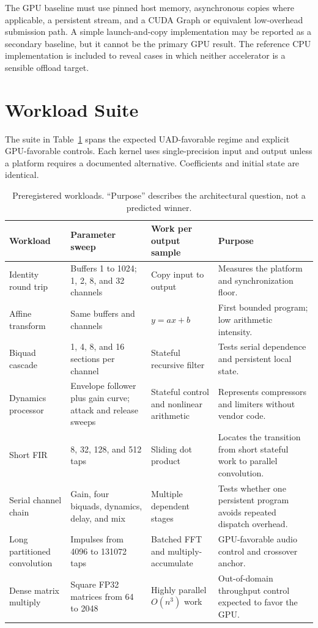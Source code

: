 \documentclass[10pt,twocolumn,twoside]{article}
\begin{document}
The GPU baseline must use pinned host memory, asynchronous copies where
applicable, a persistent stream, and a CUDA Graph or equivalent low-overhead
submission path. A simple launch-and-copy implementation may be reported as a
secondary baseline, but it cannot be the primary GPU result. The reference CPU
implementation is included to reveal cases in which neither accelerator is a
sensible offload target.

\section{Workload Suite}

The suite in Table~\ref{tab:workloads} spans the expected UAD-favorable regime
and explicit GPU-favorable controls. Each kernel uses single-precision input
and output unless a platform requires a documented alternative. Coefficients
and initial state are identical.

\begin{table}[t]
\centering
\caption{Preregistered workloads. ``Purpose'' describes the architectural
question, not a predicted winner.}
\label{tab:workloads}
\small
\begin{tabularx}{0.98\textwidth}{@{}p{}p{}p{}X@{}}
\toprule
Workload & Parameter sweep & Work per output sample & Purpose \\
\midrule
Identity round trip & Buffers 1 to 1024; 1, 2, 8, and 32 channels & Copy input to output & Measures the platform and synchronization floor. \\
Affine transform & Same buffers and channels & $y=ax+b$ & First bounded program; low arithmetic intensity. \\
Biquad cascade & 1, 4, 8, and 16 sections per channel & Stateful recursive filter & Tests serial dependence and persistent local state. \\
Dynamics processor & Envelope follower plus gain curve; attack and release sweeps & Stateful control and nonlinear arithmetic & Represents compressors and limiters without vendor code. \\
Short FIR & 8, 32, 128, and 512 taps & Sliding dot product & Locates the transition from short stateful work to parallel convolution. \\
Serial channel chain & Gain, four biquads, dynamics, delay, and mix & Multiple dependent stages & Tests whether one persistent program avoids repeated dispatch overhead. \\
Long partitioned convolution & Impulses from 4096 to 131072 taps & Batched FFT and multiply-accumulate & GPU-favorable audio control and crossover anchor. \\
Dense matrix multiply & Square FP32 matrices from 64 to 2048 & Highly parallel $O(n^3)$ work & Out-of-domain throughput control expected to favor the GPU. \\
\bottomrule
\end{tabularx}
\end{table}
\end{document}
